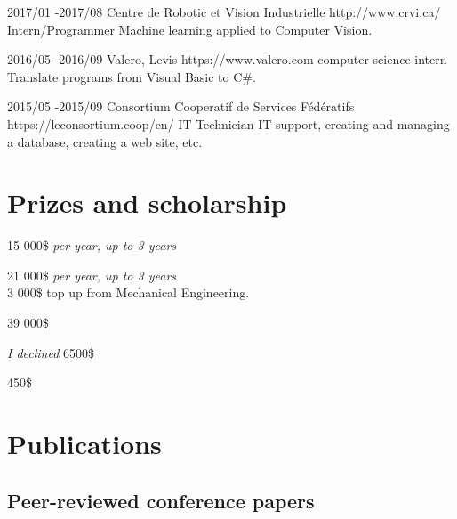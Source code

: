 \documentclass[10pt]{article} %
\begin{document}

\job
{2017/01 -}{2017/08}
{Centre de Robotic et Vision Industrielle}
{http://www.crvi.ca/}
{Intern/Programmer}
{Machine learning applied to Computer Vision.}

\job
{2016/05 -}{2016/09}
{Valero, Levis}
{https://www.valero.com}
{computer science intern}
{Translate programs from Visual Basic to C\#.}

\job
{2015/05 -}{2015/09}
{Consortium Cooperatif de Services Fédératifs}
{https://leconsortium.coop/en/}
{IT Technician}
{IT support, creating and managing a database, creating a web site, etc.}


\section{Prizes and scholarship}

{
 15 000\$ \textit{per year, up to 3 years} \\
}

{
 21 000\$ \textit{per year, up to 3 years} \\
 3 000\$ top up from Mechanical Engineering.\\
}

{
\textit{} 39 000\$\\
}

{
\textit{I declined} 6500\$\\
}

{
\textit{} 450\$\\
}

\section{Publications}
\subsection{Peer-reviewed conference papers}
\end{document}
